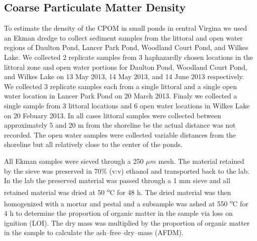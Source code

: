 \subsection{Coarse Particulate Matter Density}

To estimate the density of the CPOM in small ponds in central Virgina we used an Ekman dredge to collect sediment samples from the littoral and open water regions of Daulton Pond, Lancer Park Pond, Woodland Court Pond, and Wilkes Lake. We collected 2 replicate samples from 3 haphazardly chosen locations in the littoral zone and open water portions for Daulton Pond, Woodland Court Pond, and Wilkes Lake on 13 May 2013, 14 May 2013, and 14 June 2013 respectively. We collected 3 replicate samples each from a single littoral and a single open water location in Lancer Park Pond on 20 March 2013.  Finaly we collected a single sample from 3 littoral locations and 6 open water locations in Wilkes Lake on 20 Febuary 2013. In all cases littoral samples were collected between approximately 5 and 20 m from the shoreline be the actual distance was not recorded.  The open water samples were collected variable distances from the shoreline but all relatively close to the center of the ponds.

All Ekman samples were sieved through a 250 $\mu m$ mesh. The material retained by the sieve was preserved in 70\% (v:v) ethanol and transported back to the lab.  In the lab the preserved material was passed through a 1 mm sieve and all retained material was dried at 50 \textsuperscript{o}C for 48 h.  The dried material was then homogenized with a mortar and pestal and a subsample was ashed at 550 \textsuperscript{o}C for 4 h to determine the proportion of organic matter in the sample via loss on ignition (LOI).  The dry mass was multiplied by the proportion of organic matter in the sample to calculate the ash--free--dry--mass (AFDM).
  
  